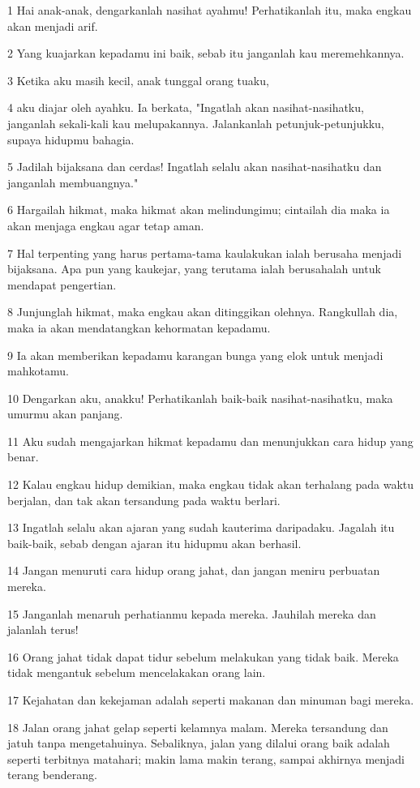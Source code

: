 \par 1 Hai anak-anak, dengarkanlah nasihat ayahmu! Perhatikanlah itu, maka engkau akan menjadi arif.
\par 2 Yang kuajarkan kepadamu ini baik, sebab itu janganlah kau meremehkannya.
\par 3 Ketika aku masih kecil, anak tunggal orang tuaku,
\par 4 aku diajar oleh ayahku. Ia berkata, "Ingatlah akan nasihat-nasihatku, janganlah sekali-kali kau melupakannya. Jalankanlah petunjuk-petunjukku, supaya hidupmu bahagia.
\par 5 Jadilah bijaksana dan cerdas! Ingatlah selalu akan nasihat-nasihatku dan janganlah membuangnya."
\par 6 Hargailah hikmat, maka hikmat akan melindungimu; cintailah dia maka ia akan menjaga engkau agar tetap aman.
\par 7 Hal terpenting yang harus pertama-tama kaulakukan ialah berusaha menjadi bijaksana. Apa pun yang kaukejar, yang terutama ialah berusahalah untuk mendapat pengertian.
\par 8 Junjunglah hikmat, maka engkau akan ditinggikan olehnya. Rangkullah dia, maka ia akan mendatangkan kehormatan kepadamu.
\par 9 Ia akan memberikan kepadamu karangan bunga yang elok untuk menjadi mahkotamu.
\par 10 Dengarkan aku, anakku! Perhatikanlah baik-baik nasihat-nasihatku, maka umurmu akan panjang.
\par 11 Aku sudah mengajarkan hikmat kepadamu dan menunjukkan cara hidup yang benar.
\par 12 Kalau engkau hidup demikian, maka engkau tidak akan terhalang pada waktu berjalan, dan tak akan tersandung pada waktu berlari.
\par 13 Ingatlah selalu akan ajaran yang sudah kauterima daripadaku. Jagalah itu baik-baik, sebab dengan ajaran itu hidupmu akan berhasil.
\par 14 Jangan menuruti cara hidup orang jahat, dan jangan meniru perbuatan mereka.
\par 15 Janganlah menaruh perhatianmu kepada mereka. Jauhilah mereka dan jalanlah terus!
\par 16 Orang jahat tidak dapat tidur sebelum melakukan yang tidak baik. Mereka tidak mengantuk sebelum mencelakakan orang lain.
\par 17 Kejahatan dan kekejaman adalah seperti makanan dan minuman bagi mereka.
\par 18 Jalan orang jahat gelap seperti kelamnya malam. Mereka tersandung dan jatuh tanpa mengetahuinya. Sebaliknya, jalan yang dilalui orang baik adalah seperti terbitnya matahari; makin lama makin terang, sampai akhirnya menjadi terang benderang.
